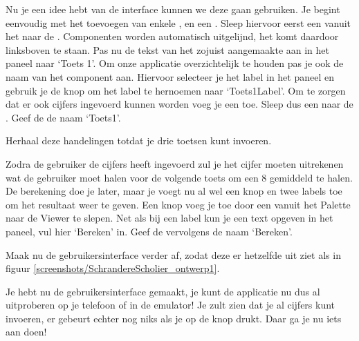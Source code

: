 Nu je een idee hebt van de interface kunnen we deze gaan gebruiken. Je begint eenvoudig met het toevoegen van enkele ,  en een . Sleep hiervoor eerst een  vanuit het  naar de . Componenten worden automatisch uitgelijnd, het  komt daardoor linksboven te staan. Pas nu de tekst van het zojuist aangemaakte  aan in het  paneel naar `Toets 1'. Om onze applicatie overzichtelijk te houden pas je ook de naam van het component aan. Hiervoor selecteer je het label in het  paneel en gebruik je de knop  om het label te hernoemen naar `Toets1Label'.
Om te zorgen dat er ook cijfers ingevoerd kunnen worden voeg je een  toe. 
Sleep dus een  naar de . Geef de  de naam `Toets1'. 

\begin{opgave}
    \opgVraag
	Herhaal deze handelingen totdat je drie toetsen kunt invoeren.
\end{opgave}

Zodra de gebruiker de cijfers heeft ingevoerd zul je het cijfer moeten uitrekenen wat de gebruiker moet halen voor de volgende toets om een 8 gemiddeld te halen. De berekening doe je later, maar je voegt nu al wel een knop en twee labels toe om het resultaat weer te geven. Een knop voeg je toe door een  vanuit het Palette naar de Viewer te slepen. Net als bij een label kun je een text opgeven in het  paneel, vul hier `Bereken' in. Geef de  vervolgens de naam `Bereken'.

\begin{opgave}
    \opgVraag
Maak nu de gebruikersinterface verder af, zodat deze er hetzelfde uit ziet als in figuur \ref{screenshots/SchrandereScholier_ontwerp1}.
\end{opgave}


\runOpTelefoon{}
Je hebt nu de gebruikersinterface gemaakt, je kunt de applicatie nu dus al uitproberen op je telefoon of in de emulator! Je zult zien dat je al cijfers kunt invoeren, er gebeurt echter nog niks als je op de knop drukt. Daar ga je nu iets aan doen!

